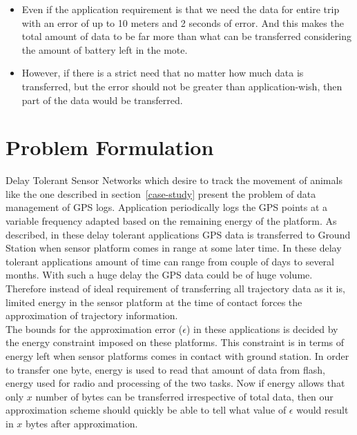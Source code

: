 \documentclass[conference]{IEEEtran}
\begin{document}
\begin{itemize}
\item Even if the application requirement is that we need the data for entire trip with an error of 
up to 10 meters and 2 seconds of error. And this makes the total amount of data to be far more than 
what can be transferred considering the amount of battery left in the mote.
\item However, if there is a strict need that no matter how much data is transferred, but the error 
should not be greater than application-wish, then part of the data would be transferred. 
\end{itemize}

\section{Problem Formulation}\label{sec:problem}

Delay Tolerant Sensor Networks which desire to track the movement of animals like the one described in 
section~\ref{case-study} present the problem of data management of GPS logs. Application periodically 
logs the GPS points at a variable frequency adapted based on the remaining energy of the platform. 
As described, in these delay tolerant applications GPS data is transferred to Ground Station when 
sensor platform comes in range at some later time. In these delay tolerant applications amount of time 
can range from couple of days to several months. With such a huge delay the GPS data could be of huge 
volume. Therefore instead of ideal requirement of transferring all trajectory data as it is, limited energy in 
the sensor platform at the time of contact forces the approximation of trajectory information. \\

The bounds for the approximation error ($\epsilon$) in these applications is decided by the energy constraint 
imposed on these platforms. This constraint is in terms of energy left when sensor platforms comes in contact 
with ground station. In order to transfer one byte, energy is used to read that amount of data from flash, energy 
used for radio and processing of the two tasks. Now if energy allows that only $x$ number of bytes can be transferred 
irrespective of total data, then our approximation scheme should quickly be able to tell what value of $\epsilon$ 
would result in $x$ bytes after approximation.\\
\end{document}
